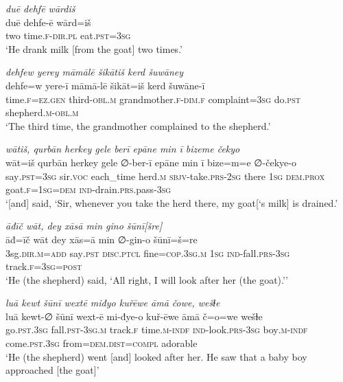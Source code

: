 \ea \label{KŠ.26}
\textit{duē dehfē wārdiš} \\ 
\gll duē dehfe-ē wārd=iš \\ 
 two time\textsc{.f}\textsc{-dir}\textsc{.pl} eat\textsc{.pst}\textsc{=3sg} \\ 
\glt `He drank milk [from the goat] two times.'
\z 
 
\ea \label{KŠ.27}
\textit{dehfew yerey māmālē šikātiš kerd šuwāney} \\ 
\gll dehfe=w yere-ī māmā-lē šikāt=iš kerd šuwāne-ī \\ 
 time\textsc{.f}\textsc{=ez.gen} third\textsc{-obl}\textsc{.m} grandmother\textsc{.f}\textsc{-dim}\textsc{.f} complaint\textsc{=3sg} do\textsc{.pst} shepherd\textsc{.m}\textsc{-obl}\textsc{.m} \\ 
\glt `The third time, the grandmother complained to the shepherd.'
\z 
 
\ea \label{KŠ.28}
\textit{wātiš, qurbān herkey gele berī epāne min ī bizeme čekyo} \\ 
\gll wāt=iš qurbān herkey gele ∅-ber-ī epāne min ī bize=m=e ∅-čekye-o \\ 
 say\textsc{.pst}\textsc{=3sg} sir.\textsc{voc} each\_time herd\textsc{.m} \textsc{sbjv-}take\textsc{.prs}-\textsc{2sg} there \textsc{1sg} \textsc{dem.prox} goat\textsc{.f}\textsc{=\textsc{1sg}}\textsc{=dem} \textsc{ind-}drain\textsc{.prs}.pass\textsc{-3sg} \\ 
\glt `[and] said, ‘Sir, whenever you take the herd there, my goat[‘s milk] is drained.'
\z 
 
\ea \label{KŠ.29}
\textit{āđīč wāt, dey xāsā min gino šūnī[šre]} \\ 
\gll āđ=īč wāt dey xās=ā min ∅-gin-o šūnī=š=re \\ 
 3sg\textsc{.dir}\textsc{.m}\textsc{=add} say\textsc{.pst} \textsc{disc.ptcl} fine\textsc{=cop}\textsc{.3sg}\textsc{.m} \textsc{1sg} \textsc{ind-}fall\textsc{.prs}\textsc{-3sg} track\textsc{.f}\textsc{=3sg}\textsc{=\textsc{post}} \\ 
\glt `He (the shepherd) said, ‘All right, I will look after her (the goat).’'
\z 
 
\ea \label{KŠ.30}
\textit{luā kewt šūnī wextē miđyo kuřēwe āmā čowe, wešɫe} \\ 
\gll luā kewt-∅ šūnī wext-ē mi-đye-o kuř-ēwe āmā č=o=we wešɫe \\ 
 go\textsc{.pst}\textsc{.3sg} fall\textsc{.pst}\textsc{-3sg}\textsc{.m} track\textsc{.f} time\textsc{.m}\textsc{-indf} \textsc{ind-}look\textsc{.prs}\textsc{-3sg} boy\textsc{.m}\textsc{-indf} come\textsc{.pst}\textsc{.3sg} from=\textsc{dem.dist}\textsc{=compl} adorable \\ 
\glt `He (the shepherd) went [and] looked after her. He saw that a baby boy approached [the goat]'
\z 
 
